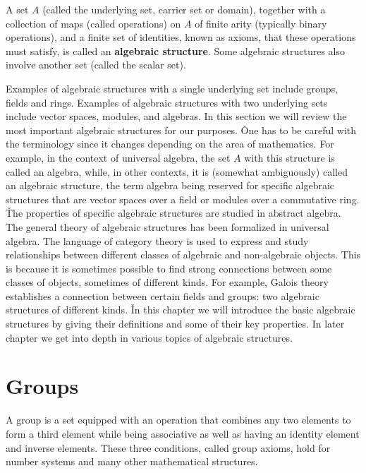 A set $A$ (called the underlying set, carrier set or domain), together with a collection of maps (called operations)
on $A$ of finite arity (typically binary operations), and a finite set of identities, known as axioms, that these
operations must satisfy, is called an \textbf{algebraic structure}. Some algebraic structures also involve another
set (called the scalar set). \ed

Examples of algebraic structures with a single underlying set include groups, fields and rings. Examples of algebraic
structures with two underlying sets include vector spaces, modules, and algebras. In this section we will review the
most important algebraic structures for our purposes. \v

One has to be careful with the terminology since it changes depending on the area of mathematics. For example, in the
context of universal algebra, the set $A$ with this structure is called an algebra, while, in other contexts, it is
(somewhat ambiguously) called an algebraic structure, the term algebra being reserved for specific algebraic
structures that are vector spaces over a field or modules over a commutative ring. \v

The properties of specific algebraic structures are studied in abstract algebra. The general theory of algebraic
structures has been formalized in universal algebra. The language of category theory is used to express and study
relationships between different classes of algebraic and non-algebraic objects. This is because it is sometimes
possible to find strong connections between some classes of objects, sometimes of different kinds. For example,
Galois theory establishes a connection between certain fields and groups: two algebraic structures of different kinds.
\v

In this chapter we will introduce the basic algebraic structures by giving their definitions and some of their key
properties. In later chapter we get into depth in various topics of algebraic structures.

\section{Groups}

A group is a set equipped with an operation that combines any two elements to form a third element while being
associative as well as having an identity element and inverse elements. These three conditions, called group axioms,
hold for number systems and many other mathematical structures.

